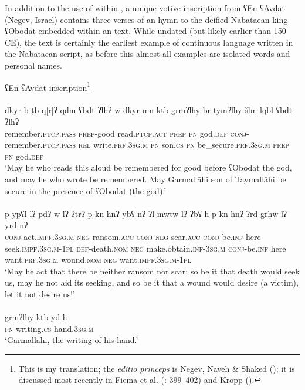 \documentclass[output=paper]{langsci/langscibook}
\begin{document}
In addition to the use of  within , a unique votive inscription from ʕEn ʕAvdat (Negev, Israel) contains three verses of an  hymn to the deified Nabataean king ʕObodat embedded within an  text. While undated (but likely earlier than 150 CE), the text is certainly the earliest example of continuous  language written in the Nabataean script, as before this almost all examples are isolated words and personal names.

\ea ʕEn ʕAvdat inscription\footnote{This is my translation; the \textit{editio princeps} is Negev, Naveh \& Shaked (\citeyear{Negevetal1986}); it is discussed most recently in Fiema et al. (\citeyear{Fiemaetal2015}: 399–402) and Kropp (\citeyear{Kropp2017}).} \\
 \\ 
\gll    dkyr b-ṭb q[r]ʔ qdm ʕbdt ʔlhʔ w-dkyr mn ktb grmʔlhy br tymʔlhy šlm lqbl ʕbdt ʔlhʔ \\
remember.\textsc{ptcp.pass} \textsc{prep}-good read.\textsc{ptcp.act} \textsc{prep} \textsc{pn} god.\textsc{def} \textsc{conj}-remember.\textsc{ptcp.pass} \textsc{rel} write.\textsc{prf.3sg.m} \textsc{pn} son.\textsc{cs} \textsc{pn} be\_secure.\textsc{prf.3sg.m} \textsc{prep} \textsc{pn} god.\textsc{def} \\ 
\glt `May he who reads this aloud be remembered for good before ʕObodat the god, and may he who wrote be remembered. May Garmallāhi son of Taymallāhi be secure in the presence of ʕObodat (the god).'\\

 \\
\gll   p-ypʕl lʔ pdʔ w-lʔ ʔtrʔ p-kn hnʔ ybʕ-nʔ ʔl-mwtw lʔ ʔbʕ-h p-kn hnʔ ʔrd grḥw lʔ yrd-nʔ \\
       \textsc{conj}-act.\textsc{impf.3sg.m} \textsc{neg} ransom.\textsc{acc} \textsc{conj}-\textsc{neg} scar.\textsc{acc} \textsc{conj}-be.\textsc{inf} here seek.\textsc{impf.3sg.m-1pl} \textsc{def}-death.\textsc{nom} \textsc{neg} make.obtain.\textsc{inf-3sg.m} \textsc{conj}-be.\textsc{inf} here want.\textsc{prf.3sg.m} wound.\textsc{nom} \textsc{neg} want.\textsc{impf.3sg.m-1pl} \\
\glt `May he act that there be neither ransom nor scar; so be it that death would seek us, may he not aid its seeking, and so be it that a wound would desire (a victim), let it not desire us!'\\

 \\
\gll   grmʔlhy ktb yd-h \\
\textsc{pn} writing.\textsc{cs} hand.\textsc{3sg.m} \\
\glt `Garmallāhi, the writing of his hand.’\\
\z
\z
\end{document}

